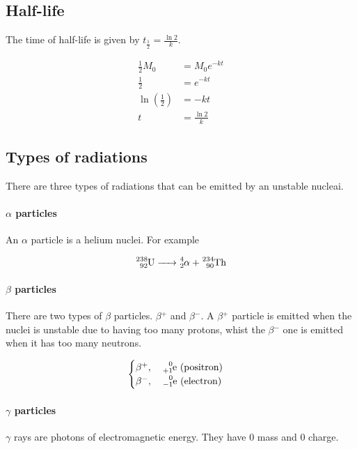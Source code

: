 \documentclass[a4paper]{article}
\begin{document}
\subsection{Half-life}

The time of half-life is given by \(t_\frac{1}{2} = \frac{\ln 2}{k}\).

\begin{align*}
    \frac{1}{2}M_0 &= M_0 e^{-kt} \\
    \frac{1}{2} &= e^{-kt} \\
    \ln\left(\frac{1}{2}\right) &= -kt \\
    t &= \frac{\ln 2}{k}
\end{align*}

\subsection{Types of radiations}

There are three types of radiations that can be emitted by an unstable nucleai.

\paragraph{\(\alpha\) particles}

An \(\alpha\) particle is a helium nuclei. For example

\[
    \ce{^238_92U -> ^4_2\alpha{} + ^234_90Th}
\]

\paragraph{\(\beta\) particles}

There are two types of \(\beta{}\) particles. \(\beta{}^+\) and \(\beta{}^-\).
A \(\beta{}^+\) particle is emitted when the nuclei is unstable due to
having too many protons, whist the \(\beta{}^-\) one is emitted when it has
too many neutrons.

\[
    \begin{cases}
        \beta{}^+,\quad \ce{^0_{+1}e} \text{ (positron)} \\
        \beta{}^-,\quad \ce{^0_{-1}e} \text{ (electron)}
    \end{cases}
\]

\paragraph{\(\gamma\) particles}

\(\gamma\) rays are photons of electromagnetic energy. They have \(0\) mass and \(0\) charge.
\end{document}
